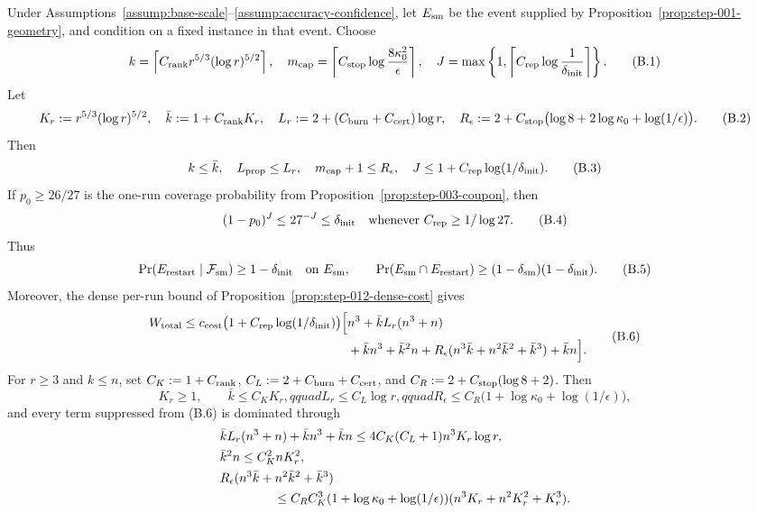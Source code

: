 \begin{proposition}\label{prop:rate-specialization-bridge}
Under Assumptions~\ref{assump:base-scale}--\ref{assump:accuracy-confidence},
let $E_{\rm sm}$ be the event supplied by
Proposition~\ref{prop:step-001-geometry}, and condition on a fixed instance in
that event. Choose
\[
 k=\left\lceil C_{\rm rank}r^{5/3}(\log r)^{5/2}\right\rceil,
 \quad m_{\rm cap}=\left\lceil C_{\rm stop}\log\frac{8\kappa _0^2}{\epsilon}\right\rceil,
 \quad J=\max\left\{1,\left\lceil C_{\rm rep}\log\frac1{\delta_{\rm init}}\right\rceil\right\}.
\tag{B.1}
\]
Let
\[
 K_r:=r^{5/3}(\log r)^{5/2},\quad
 \bar k:=1+C_{\rm rank}K_r,\quad
 L_r:=2+(C_{\rm burn}+C_{\rm cert})\log r,\quad
 R_\epsilon:=2+C_{\rm stop}\bigl(\log 8+2\log\kappa _0+\log(1/\epsilon)\bigr).
\tag{B.2}
\]
Then
\[
 k\le\bar k,\quad
 L_{\rm prop}\le L_r,\quad
 m_{\rm cap}+1\le R_\epsilon,\quad
 J\le1+C_{\rm rep}\log(1/\delta_{\rm init}).
\tag{B.3}
\]
If $p_0\ge26/27$ is the one-run coverage probability from
Proposition~\ref{prop:step-003-coupon}, then
\[
 (1-p_0)^J\le27^{-J}\le\delta_{\rm init}
 \quad\text{whenever }C_{\rm rep}\ge1/\log 27.
\tag{B.4}
\]
Thus
\[
\Pr(E_{\rm restart}\mid\mathcal F_{\rm sm})\ge1-\delta_{\rm init}
\quad\text{on }E_{\rm sm},\qquad
\Pr(E_{\rm sm}\cap E_{\rm restart})
\ge(1-\delta_{\rm sm})(1-\delta_{\rm init}).
\tag{B.5}
\]
Moreover, the dense per-run bound of
Proposition~\ref{prop:step-012-dense-cost} gives
\[
\begin{aligned}
W_{\rm total}
\le c_{\rm cost}\bigl(1+C_{\rm rep}\log(1/\delta_{\rm init})\bigr)
\Big[&n^3+\bar kL_r(n^3+n)\\
&+\bar k n^3+\bar k^2n
+R_\epsilon(n^3\bar k+n^2\bar k^2+\bar k^3)+\bar k n\Big].
\end{aligned}
\tag{B.6}
\]
For $r\ge3$ and $k\le n$, set
$C_K:=1+C_{\rm rank}$,
$C_L:=2+C_{\rm burn}+C_{\rm cert}$, and
$C_R:=2+C_{\rm stop}(\log8+2)$. Then
\[
K_r\ge1,\qquad \bar k\le C_KK_r,qquad
L_r\le C_L\log r,qquad
R_\epsilon\le C_R\bigl(1+\log\kappa _0+\log(1/\epsilon)\bigr),
\tag{B.7}
\]
and every term suppressed from (B.6) is dominated through
\[
\begin{aligned}
&\bar kL_r(n^3+n)+\bar k n^3+\bar k n
 \le4C_K(C_L+1)n^3K_r\log r,\\
&\bar k^2n\le C_K^2nK_r^2,\\
&R_\epsilon(n^3\bar k+n^2\bar k^2+\bar k^3)\\
&\hspace{15mm}\le C_RC_K^3
 (1+\log\kappa _0+\log(1/\epsilon))
 (n^3K_r+n^2K_r^2+K_r^3).

\end{aligned}\]
\end{proposition}
